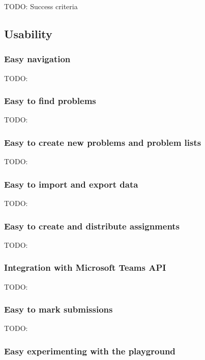\documentclass[a4paper]{report}
\begin{document}
TODO: Success criteria

\subsection{Usability}

\subsubsection{Easy navigation}

TODO:

\subsubsection{Easy to find problems}

TODO:

\subsubsection{Easy to create new problems and problem lists}

TODO:

\subsubsection{Easy to import and export data}

TODO:

\subsubsection{Easy to create and distribute assignments}

TODO:

\subsubsection{Integration with Microsoft Teams API}

TODO:

\subsubsection{Easy to mark submissions}

TODO:

\subsubsection{Easy experimenting with the playground}
\end{document}
